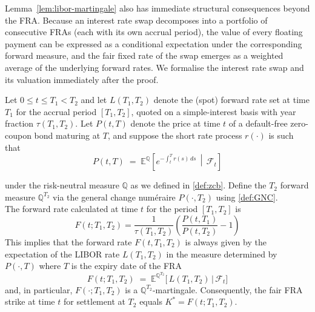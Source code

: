     \noindent
    Lemma~\ref{lem:libor-martingale} also has immediate structural consequences beyond the FRA. Because an interest rate swap decomposes into a portfolio of consecutive FRAs (each with its own accrual period), the value of every floating payment can be expressed as a conditional expectation under the corresponding forward measure, and the fair fixed rate of the swap emerges as a weighted average of the underlying forward rates. We formalise the interest rate swap and its valuation immediately after the proof.

    \begin{lemma} \label{lem:libor-martingale}
    
      Let $0 \le t \le T_1 < T_2$ and let $L(T_1,T_2)$ denote the (spot) forward rate set at time $T_1$ for the accrual period $[T_1,T_2]$, quoted on a simple-interest basis with year fraction $\tau(T_1,T_2)$. Let $P(t,T)$ denote the price at time $t$ of a default-free zero-coupon bond maturing at $T$, and suppose the short rate process $r(\cdot)$ is such that \\
      
    \begin{equation}
         P(t,T) \;=\; \mathbb{E}^{\mathbb{Q}}\!\left[ e^{-\int_t^T r(s)\,ds} \,\middle|\, \mathcal{F}_t \right]
    \end{equation}
  
    \noindent  
    under the risk-neutral measure $\mathbb{Q}$ as we defined in \ref{def:zcb}. Define the $T_2$ forward measure $\mathbb{Q}^{T_2}$ via the general change numéraire $P(\cdot,T_2)$ using  \ref{def:GNC}.\\

    \noindent
    The forward rate calculated at time $t$ for the period $[T_1,T_2]$ is
    \begin{equation}
        F(t;T_1,T_2) = \frac{1}{\tau(T_1,T_2)}\!\left(\frac{P(t,T_1)}{P(t,T_2)} - 1\right)
    \end{equation}
    \noindent
    This implies that the forward rate $F(t,T_1,T_2)$ is always given by the expectation of the LIBOR rate $L(T_1,T_2)$ in the measure determined by $P(\cdot,T)$ where $T$ is the expiry date of the FRA
    \begin{equation}
        F(t;T_1,T_2) \;=\; \mathbb{E}^{\mathbb{Q}^{T_2}}\!\big[\, L(T_1,T_2) \,\big|\, \mathcal{F}_t \big]
    \end{equation}
    and, in particular, $F(\cdot;T_1,T_2)$ is a $\mathbb{Q}^{T_2}$-martingale. Consequently, the fair FRA strike at time $t$ for settlement at $T_2$ equals $K^\ast = F(t;T_1,T_2)$.
    \end{lemma}

